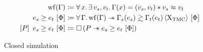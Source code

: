 \begin{figure}[tp]
    \begin{align*}
    		\wf{\Gamma}
    		&\coloneqq
    		\forall x \ldotp
    		\exists v_s, v_t \ldotp
    		\Gamma (x) = (v_s, v_t) \iSep
    		v_s \iSimilar v_t
    	\\
    		\iCsimv{\Phi}{e_s}{e_t}
    		&\coloneqq
    		\forall \Gamma \ldotp
    		\wf{\Gamma} \iSepImp
    		\iSimv[\Chi_\mathrm{TMC}]{\Phi}{\Gamma_s (e_s)}{\Gamma_t (e_t)}
    	\\
    	   \iCsimvHoare{P}{\Phi}{e_s}{e_t}
    	   &\coloneqq
    	   \iPersistent \left( P \iSepImp \iCsimv{\Phi}{e_s}{e_t} \right)
    \end{align*}
    \caption{Closed simulation}
    \label{fig:csim}
\end{figure}